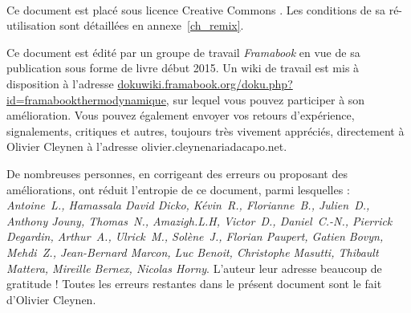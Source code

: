 \clearpage\thispagestyle{empty}



\vspace{-0.5cm}
{\center \normalsize \huge \ccLogo\ \ccAttribution\ \ccShareAlike \par}
\vspace{0.5cm}

Ce document est placé sous licence Creative Commons \myccbysa. Les conditions de sa ré-utilisation sont détaillées en annexe~\ref{ch_remix}.

\vspace{0.3cm}
\vspace{0.1cm}

Ce document est édité par un groupe de travail \textit{Framabook} en vue de sa publication sous forme de livre début 2015. Un wiki de travail est mis à disposition à l’adresse \href{http://dokuwiki.framabook.org/doku.php?id=framabookthermodynamique}{dokuwiki.framabook.org/doku.php?id=framabookthermodynamique}, sur lequel vous pouvez participer à son amélioration. Vous pouvez également envoyer vos retours d’expérience, signalements, critiques et autres, toujours très vivement appréciés, directement à Olivier Cleynen à l’adresse olivier.cleynenariadacapo.net.

De nombreuses personnes, en corrigeant des erreurs ou proposant des améliorations, ont réduit l’entropie de ce document, parmi lesquelles : {\small\textit{Antoine\ L., Hamassala David Dicko, Kévin\ R., Florianne\ B., Julien\ D., Anthony Jouny, Thomas\ N., Amazigh.L.H, Victor\ D., Daniel\ C.-N., Pierrick Degardin, Arthur\ A., Ulrick\ M., Solène\ J., Florian Paupert, Gatien Bovyn, Mehdi\ Z., Jean-Bernard Marcon, Luc Benoit, Christophe Masutti, Thibault Mattera, Mireille Bernex, Nicolas Horny}}. L’auteur leur adresse beaucoup de gratitude ! Toutes les erreurs restantes dans le présent document sont le fait d’Olivier Cleynen.

\vspace{0.3cm}


\restoregeometry
